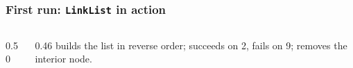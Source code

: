 \documentclass[aspectratio=169,10pt,compress]{beamer}
\begin{document}




\begin{frame}[t,fragile] \frametitle{First run: \texttt{LinkList} in action}
  \begin{columns}[T]
    \begin{column}{0.50\textwidth}
    \end{column}
    \begin{column}{0.46\textwidth}
      \small
       builds the list in reverse order;
       succeeds on 2, fails on 9; 
      removes the interior node.
    \end{column}
  \end{columns}
\end{frame}
\end{document}
